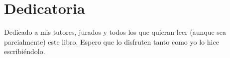 \chapter*{Dedicatoria}

Dedicado a mis tutores, jurados y todos los que quieran leer (aunque sea parcialmente) este libro. Espero que lo disfruten tanto como yo lo hice escribiéndolo.
